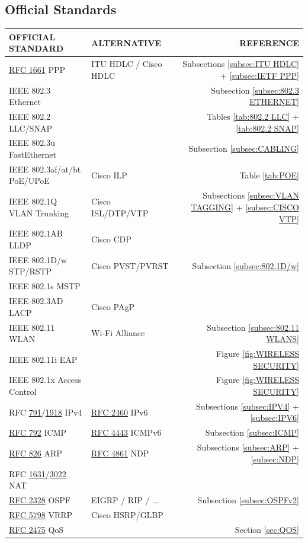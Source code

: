\documentclass[12pt]{article}
\newcommand{\rfc}[1]{\href{https://datatracker.ietf.org/doc/html/rfc#1}{#1}}
\newcommand{\RFC}[1]{\href{https://datatracker.ietf.org/doc/html/rfc#1}{RFC #1}}
\begin{document}
	\subsection{Official Standards \label{subsec:STANDARDS}}
	\begin{table}[H]
	\centering
	\begin{tabular}{llr}
	\textbf{OFFICIAL STANDARD}	& \textbf{ALTERNATIVE}		& \textbf{REFERENCE}\\\hline
	\RFC{1661} PPP			& ITU HDLC / Cisco HDLC	& Subsections \ref{subsec:ITU HDLC} + \ref{subsec:IETF PPP}\\\hline
	IEEE 802.3 Ethernet		&					& Subsection \ref{subsec:802.3 ETHERNET}\\
	IEEE 802.2 LLC/SNAP		&					& Tables \ref{tab:802.2 LLC} + \ref{tab:802.2 SNAP}\\
	IEEE 802.3u FastEthernet		&					& Subsection \ref{subsec:CABLING}\\
	IEEE 802.3af/at/bt PoE/UPoE	& Cisco ILP				& Table \ref{tab:POE}\\\hline
	IEEE 802.1Q VLAN Trunking	& Cisco ISL/DTP/VTP		& Subsections \ref{subsec:VLAN TAGGING} + \ref{subsec:CISCO VTP}\\
	IEEE 802.1AB LLDP		& Cisco CDP			&\\
	IEEE 802.1D/w STP/RSTP		& Cisco PVST/PVRST		& Subsection \ref{subsec:802.1D/w}\\
	IEEE 802.1s MSTP			&					&\\
	IEEE 802.3AD LACP		& Cisco PAgP			&\\\hline
	IEEE 802.11 WLAN			& Wi-Fi Alliance			& Subsection \ref{subsec:802.11 WLANS}\\
	IEEE 802.11i EAP			& 					&Figure \ref{fig:WIRELESS SECURITY}\\
	IEEE 802.1x Access Control	&					& Figure \ref{fig:WIRELESS SECURITY}\\\hline
	RFC \rfc{791}/\rfc{1918} IPv4	& \RFC{2460} IPv6		& Subsections \ref{subsec:IPV4} + \ref{subsec:IPV6}\\
	\RFC{792} ICMP			& \RFC{4443} ICMPv6		& Subsection \ref{subsec:ICMP}\\
	\RFC{826} ARP			& \RFC{4861} NDP		& Subsections \ref{subsec:ARP} + \ref{subsec:NDP}\\
	RFC \rfc{1631}/\rfc{3022} NAT	&					&\\
	\RFC{2328} OSPF			& EIGRP / RIP / ...			& Subsection \ref{subsec:OSPFv2}\\
	\RFC{5798} VRRP			& Cisco HSRP/GLBP		&\\
	\RFC{2475} QoS			&					& Section \ref{sec:QOS}\\\hline

\end{tabular}
\end{table}
\end{document}
